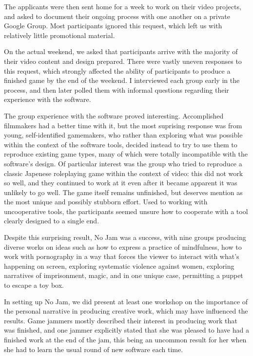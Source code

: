 The applicants were then sent home for a week to work on their video projects, and asked to document their ongoing process with one another on a private Google Group. Most participants ignored this request, which left us with relatively little promotional material.

On the actual weekend, we asked that participants arrive with the majority of their video content and design prepared. There were vastly uneven responses to this request, which strongly affected the ability of participants to produce a finished game by the end of the weekend. I interviewed each group early in the process, and then later polled them with informal questions regarding their experience with the software.

The group experience with the software proved interesting. Accomplished filmmakers had a better time with it, but the most suprising response was from young, self-identified gamemakers, who rather than exploring what was possible within the context of the software tools, decided instead to try to use them to reproduce existing game types, many of which were totally incompatible with the software's design. Of particular interest was the group who tried to reproduce a classic Japenese roleplaying game within the context of video: this did not work so well, and they continued to work at it even after it became apparent it was unlikely to go well. The game itself remains unfinished, but deserves mention as the most unique and possibly stubborn effort. Used to working with uncooperative tools, the participants seemed unsure how to cooperate with a tool clearly designed to a single end.

Despite this surprising result, No Jam was a success, with nine groups producing diverse works on ideas such as how to express a practice of mindfulness, how to work with pornography in a way that forces the viewer to interact with what's happening on screen, exploring systematic violence against women, exploring narratives of imprisonment, magic, and in one unique case, permitting a puppet to escape a toy box. 

In setting up No Jam, we did present at least one workshop on the importance of the personal narrative in producing creative work, which may have influenced the results. Game jammers mostly described their interest in producing work that was finished, and one jammer explicitly stated that she was pleased to have had a finished work at the end of the jam, this being an uncommon result for her when she had to learn the usual round of new software each time.

